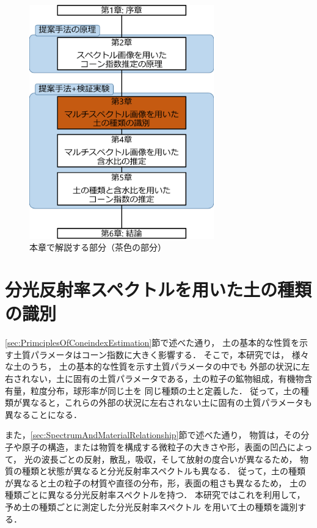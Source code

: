 \begin{figure}[p]
	\begin{center}
	\centering
	\includegraphics[width=8cm]{./Ch3_SoilTypeDiscrimination/Fig/thesis_constitution_ch3_compressed.pdf}
	\caption{本章で解説する部分（茶色の部分）}\label{fig:thesis_constitution_ch3}
	\end{center}
\end{figure}


\clearpage


\section{分光反射率スペクトルを用いた土の種類の識別}
\label{sec:SoilTypeDiscriminationFromSpectrum}

\ref{sec:PrimciplesOfConeindexEstimation}節で述べた通り，
土の基本的な性質を示す土質パラメータはコーン指数に大きく影響する．
そこで，本研究では，
様々な土のうち，
土の基本的な性質を示す土質パラメータの中でも
外部の状況に左右されない，土に固有の土質パラメータである，土の粒子の鉱物組成，有機物含有量，粒度分布，球形率が同じ土を
同じ種類の土と定義した．
従って，土の種類が異なると，これらの外部の状況に左右されない土に固有の土質パラメータも異なることになる．

また，\ref{sec:SpectrumAndMaterialRelationship}節で述べた通り，
物質は，その分子や原子の構造，または物質を構成する微粒子の大きさや形，表面の凹凸によって，
光の波長ごとの反射，散乱，吸収，そして放射の度合いが異なるため，
物質の種類と状態が異なると分光反射率スペクトルも異なる．
従って，土の種類が異なると土の粒子の材質や直径の分布，形，表面の粗さも異なるため，
土の種類ごとに異なる分光反射率スペクトルを持つ．
本研究ではこれを利用して，
予め土の種類ごとに測定した分光反射率スペクトル
を用いて土の種類を識別する．

